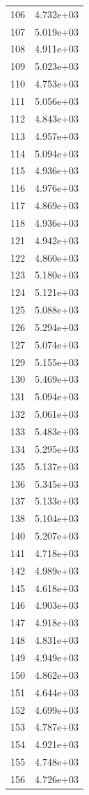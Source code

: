 \documentclass[12pt]{article}
\begin{document}
\begin{longtable}{@{}cc@{}}
106 & 4.732e+03 \\
107 & 5.019e+03 \\
108 & 4.911e+03 \\
109 & 5.023e+03 \\
110 & 4.753e+03 \\
111 & 5.056e+03 \\
112 & 4.843e+03 \\
113 & 4.957e+03 \\
114 & 5.094e+03 \\
115 & 4.936e+03 \\
116 & 4.976e+03 \\
117 & 4.869e+03 \\
118 & 4.936e+03 \\
121 & 4.942e+03 \\
122 & 4.860e+03 \\
123 & 5.180e+03 \\
124 & 5.121e+03 \\
125 & 5.088e+03 \\
126 & 5.294e+03 \\
127 & 5.074e+03 \\
129 & 5.155e+03 \\
130 & 5.469e+03 \\
131 & 5.094e+03 \\
132 & 5.061e+03 \\
133 & 5.483e+03 \\
134 & 5.295e+03 \\
135 & 5.137e+03 \\
136 & 5.345e+03 \\
137 & 5.133e+03 \\
138 & 5.104e+03 \\
140 & 5.207e+03 \\
141 & 4.718e+03 \\
142 & 4.989e+03 \\
145 & 4.618e+03 \\
146 & 4.903e+03 \\
147 & 4.918e+03 \\
148 & 4.831e+03 \\
149 & 4.949e+03 \\
150 & 4.862e+03 \\
151 & 4.644e+03 \\
152 & 4.699e+03 \\
153 & 4.787e+03 \\
154 & 4.921e+03 \\
155 & 4.748e+03 \\
156 & 4.726e+03 \\

\end{longtable}
\end{document}
